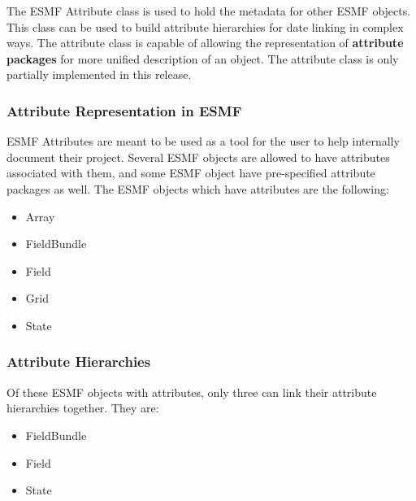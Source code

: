 %

The ESMF Attribute class is used to hold the metadata for other ESMF objects.  This class can be used to build attribute hierarchies for date linking in complex ways.  The attribute class is capable of allowing the representation of {\bf attribute packages} for more unified description of an object.  The attribute class is only partially implemented in this release. 

\subsubsection{Attribute Representation in ESMF}

ESMF Attributes are meant to be used as a tool for the user to help internally document their project.   Several ESMF objects are allowed to have attributes associated with them, and some ESMF object have pre-specified attribute packages as well.  The ESMF objects which have attributes are the following:

\begin{itemize}
\item Array
\item FieldBundle
\item Field
\item Grid
\item State
\end{itemize}

\subsubsection{Attribute Hierarchies}

Of these ESMF objects with attributes, only three can link their attribute hierarchies together.  They are:

\begin{itemize}
\item FieldBundle
\item Field
\item State
\end{itemize}

